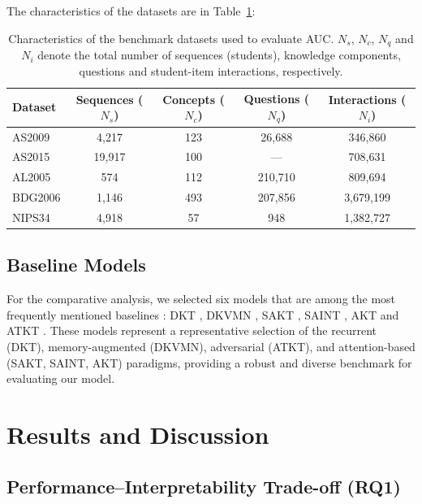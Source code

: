 \documentclass[applsci,article,submit,moreauthors,pdftex]{Definitions/mdpi}
\begin{document}
The characteristics of the datasets are  in Table~\ref{tab_datasets}: 

\begin{table}[htbp]
\centering
\begin{tabularx}{\textwidth}{lcccc}
\toprule
\textbf{Dataset} & \textbf{Sequences ($N_s$)} & \textbf{Concepts ($N_c$)} & \textbf{Questions ($N_q$)} & \textbf{Interactions ($N_i$)} \\
\midrule
AS2009 & 4,217 & 123 & 26,688 & 346,860 \\
AS2015 & 19,917 & 100 & --- & 708,631 \\
AL2005 & 574 & 112 & 210,710 & 809,694 \\
BDG2006 & 1,146 & 493 & 207,856 & 3,679,199 \\
NIPS34 & 4,918 & 57 & 948 & 1,382,727 \\
\bottomrule
\end{tabularx}
\caption{Characteristics of the benchmark datasets used to evaluate AUC. $N_s$, $N_c$, $N_q$ and $N_i$ denote the total number of sequences (students), knowledge components, questions and student-item interactions, respectively. \label{tab_datasets}}
\end{table}



\subsection{Baseline Models}\label{sec_models}

For the comparative analysis, we selected six models that are among the most frequently mentioned baselines \citep{liu2022pykt}: DKT \citep{piech2015deep}, DKVMN \citep{zhang2017dynamic}, SAKT \citep{pandey2019self}, SAINT \citep{choi2020towards}, AKT \citep{ghosh2020context} and ATKT \citep{GuoHZTL21}. These models represent a representative selection of the recurrent (DKT), memory-augmented (DKVMN), adversarial (ATKT), and attention-based (SAKT, SAINT, AKT) paradigms, providing a robust and diverse benchmark for evaluating our model.


\section{Results and Discussion} \label{sec_results}

\subsection{Performance--Interpretability Trade-off (RQ1)} \label{sec_tradeoff}
\end{document}
